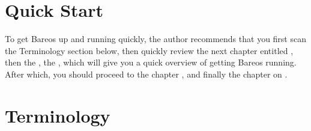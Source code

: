 \section{Quick Start}

To get Bareos up and running quickly, the author recommends
that you first scan the
Terminology section below, then quickly review the next chapter entitled
, then the
, 
the , which will
give you a quick overview of getting Bareos running. 
After which, you should
proceed to the chapter
, 
and finally the chapter on
.

\section{Terminology}

